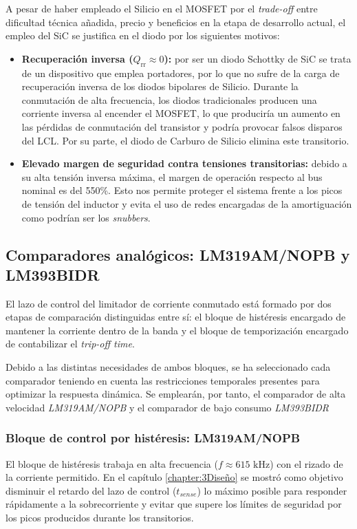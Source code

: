 \documentclass[12pt]{report} %
\begin{document}
A pesar de haber empleado el Silicio en el MOSFET por el \textit{trade-off} entre dificultad técnica añadida, precio y beneficios en la etapa de desarrollo actual, el empleo del SiC se justifica en el diodo por los siguientes motivos:

\begin{itemize}
    \item \textbf{Recuperación inversa ($Q_\text{rr} \approx 0$):} por ser un diodo Schottky de SiC se trata de un dispositivo que emplea portadores, por lo que no sufre de la carga de recuperación inversa de los diodos bipolares de Silicio. Durante la conmutación de alta frecuencia, los diodos tradicionales producen una corriente inversa al encender el MOSFET, lo que produciría un aumento en las pérdidas de conmutación del transistor y podría provocar falsos disparos del LCL. Por su parte, el diodo de Carburo de Silicio elimina este transitorio. 
    \item \textbf{Elevado margen de seguridad contra tensiones transitorias:} debido a su alta tensión inversa máxima, el margen de operación respecto al bus nominal es del 550\%. Esto nos permite proteger el sistema frente a los picos de tensión del inductor y evita el uso de redes encargadas de la amortiguación como podrían ser los \textit{snubbers}.
\end{itemize}
\subsection{Comparadores analógicos: LM319AM/NOPB y LM393BIDR}
El lazo de control del limitador de corriente conmutado está formado por dos etapas de comparación distinguidas entre sí: el bloque de histéresis encargado de mantener la corriente dentro de la banda y el bloque de temporización encargado de contabilizar el \textit{trip-off time}. 

Debido a las distintas necesidades de ambos bloques, se ha seleccionado cada comparador teniendo en cuenta las restricciones temporales presentes para optimizar la respuesta dinámica. Se emplearán, por tanto, el comparador de alta velocidad \textit{LM319AM/NOPB} y el comparador de bajo consumo \textit{LM393BIDR}

\subsubsection{Bloque de control por histéresis: LM319AM/NOPB}
El bloque de histéresis trabaja en alta frecuencia ($f\approx 615\text{ kHz}$) con el rizado de la corriente permitido. En el capítulo \ref{chapter:3Diseño} se mostró como objetivo disminuir el retardo del lazo de control ($t_{sense}$) lo máximo posible para responder rápidamente a la sobrecorriente y evitar que supere los límites de seguridad por los picos producidos durante los transitorios. 
\end{document}
